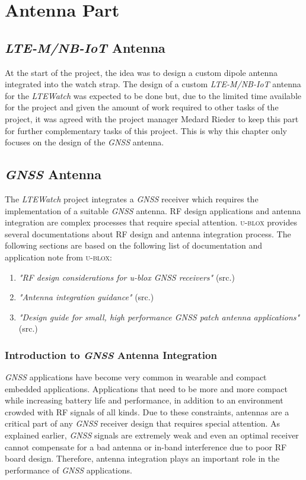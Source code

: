 \documentclass[report.tex]{subfiles}
\begin{document}
\chapter{Antenna Part}

\section{\textit{LTE-M/NB-IoT} Antenna}

At the start of the project, the idea was to design a custom dipole antenna integrated into the watch strap. The design of a custom \textit{LTE-M/NB-IoT} antenna for the \textit{LTEWatch} was expected to be done but, due to the limited time available for the project and given the amount of work required to other tasks of the project, it was agreed with the project manager Medard Rieder to keep this part for further complementary tasks of this project. This is why this chapter only focuses on the design of the \textit{GNSS} antenna.

\section{\textit{GNSS} Antenna}

The \textit{LTEWatch} project integrates a \textit{GNSS} receiver which requires the implementation of a suitable \textit{GNSS} antenna. RF design applications and antenna integration are complex processes that require special attention. \textsc{u-blox} provides several documentations about RF design and antenna integration process. The following sections are based on the following list of documentation and application note from \textsc{u-blox}:
\begin{enumerate}
\item \textit{"RF design considerations for u-blox GNSS receivers"} (src.\cite{gnss_ant_intro})
\item \textit{"Antenna integration guidance"} (src.\cite{gnss_antenna_integr})
\item \textit{"Design guide for small, high performance GNSS patch antenna applications"} (src.\cite{gnss_patch_antenna})
\end{enumerate}
\subsection{Introduction to \textit{GNSS} Antenna Integration}

\textit{GNSS} applications have become very common in wearable and compact embedded applications. Applications that need to be more and more compact while increasing battery life and performance, in addition to an environment crowded with RF signals of all kinds. Due to these constraints, antennas are a critical part of any \textit{GNSS} receiver design that requires special attention. As explained earlier, \textit{GNSS} signals are extremely weak and even an optimal receiver cannot compensate for a bad antenna or in-band interference due to poor RF board design. Therefore, antenna integration plays an important role in the performance of \textit{GNSS} applications.
\end{document}
